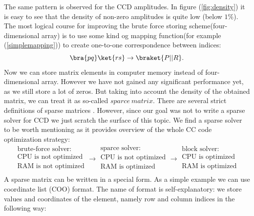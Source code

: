 \documentclass[twoside,english]{uiofysmaster}
\begin{document}
The same pattern is observed for the CCD amplitudes. In figure
(\ref{fig:density}) it is easy to see that the density of non-zero
amplitudes is quite low (below $1\%$). The most logical course for
improving the brute force storing scheme(four-dimensional array) is to
use some kind og mapping function(for example (\ref{simplemapping}))
to create one-to-one correspondence between indices:
\begin{equation}
\bra{pq}\ket{rs} \rightarrow \braket{P||R}.
\end{equation} 
Now we can store matrix elements in computer memory instead of
four-dimensional array. However we have not gained any significant
performance yet, as we still store a lot of zeros. But taking into
account the density of the obtained matrix, we can treat it as so-called
$sparce\ matrix$. There are several strict definitions of sparse
matrices \cite{PissanetzkySparseMatrixTechnology2014}. However, since our
goal was not to write a sparse solver for CCD we just scratch the
surface of this topic. We find a sparse solver to be worth mentioning as
it provides overview of the whole CC code optimization strategy:
\[
\begin{matrix} 
\text{brute-force solver:}\\
\text{CPU is not optimized}\\
\text{RAM is not optimized}\\
\end{matrix} \rightarrow
\begin{matrix} 
\text{sparce solver:}\\
\text{CPU is not optimized}\\
\text{RAM is optimized}\\
\end{matrix} \rightarrow
\begin{matrix} 
\text{block solver:}\\
\text{CPU is optimized}\\
\text{RAM is optimized}\\
\end{matrix}
\]
A sparse matrix can be written in a special form. As a simple example we can use coordinate list (COO) format. The name of format is self-explanatory: we store values and coordinates of the element, namely row and column indices in the following way:
\end{document}
